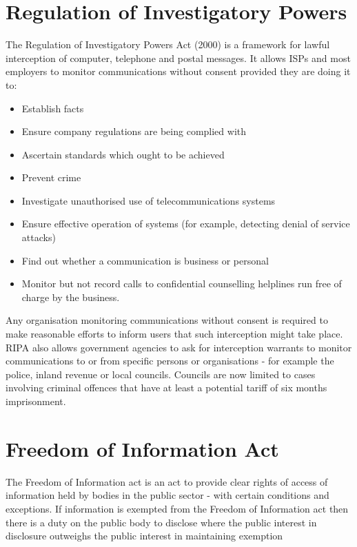 \documentclass{article}
\begin{document}
	\section{Regulation of Investigatory Powers}
	The Regulation of Investigatory Powers Act (2000) is a framework for lawful interception of computer, telephone and postal messages. It allows ISPs and most employers to monitor communications without consent provided they are doing it to:
	\begin{itemize}
		\item Establish facts
		\item Ensure company regulations are being complied with
		\item Ascertain standards which ought to be achieved
		\item Prevent crime
		\item Investigate unauthorised use of telecommunications systems
		\item Ensure effective operation of systems (for example, detecting denial of service attacks)
		\item Find out whether a communication is business or personal
		\item Monitor but not record calls to confidential counselling helplines run free of charge by the business.
	\end{itemize}
	
	Any organisation monitoring communications without consent is required to make reasonable efforts to inform users that such interception might take place. RIPA also allows government agencies to ask for interception warrants to monitor communications to or from specific persons or organisations - for example the police, inland revenue or local councils. Councils are now limited to cases involving criminal offences that have at least a potential tariff of six months imprisonment.
		
	
	\section{Freedom of Information Act}
	The Freedom of Information act is an act to provide clear rights of access of information held by bodies in the public sector - with certain conditions and exceptions. If information is exempted from the Freedom of Information act then there is a duty on the public body to disclose where the public interest in disclosure outweighs the public interest in maintaining exemption
	\newpage
	\printindex	
	
\end{document}
